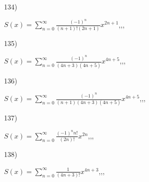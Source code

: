 \documentclass[11pt, ukrainian]{article}
\begin{document}
\par
\vspace{0.9cm}
134) \space 
{%
{$S(x)=\sum\limits_{n=0}^{\infty}{\frac{(-1)^n}{(n+1)!(2n+1)}}{x^{{2n+1}}}$},,, \par \smallskip  
}
\par
\vspace{0.9cm}
135) \space 
{%
{$S(x)=\sum\limits_{n=0}^{\infty}{\frac{(-1)^n}{(4n+3)(4n+5)}}{x^{{4n+5}}}$},,, \par \smallskip  
}
\par
\vspace{0.9cm}
136) \space 
{%
{$S(x)=\sum\limits_{n=0}^{\infty}{\frac{(-1)^n}{(n+1)(4n+3)(4n+5)}}{x^{{4n+5}}}$},,, \par \smallskip  
}
\par
\vspace{0.9cm}
137) \space 
{%
{$S(x)=\sum\limits_{n=0}^{\infty}{\frac{{(-1)^n}{n!}}{(2n)!}}{x^{{2n}}}$},,, \par \smallskip  
}
\par
\vspace{0.9cm}
138) \space 
{%
{$S(x)=\sum\limits_{n=0}^{\infty}{\frac{1}{(4n+3)!}}{x^{{4n+3}}}$},,, \par \smallskip  
}
\par
\end{document}
